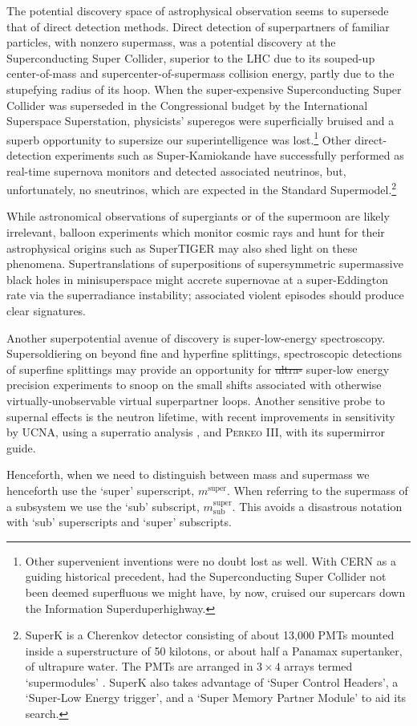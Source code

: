 The potential discovery space of astrophysical observation seems to supersede that of direct detection methods. 
Direct detection of superpartners of familiar particles, with nonzero supermass, was a potential discovery at the Superconducting Super Collider, superior to the LHC due to its souped-up center-of-mass and supercenter-of-supermass collision energy, partly due to the stupefying radius of its hoop.
When the super-expensive Superconducting Super Collider was superseded in the Congressional budget by the International Superspace Superstation, physicists' superegos were superficially bruised and a superb opportunity to supersize our superintelligence was lost.\footnote{
Other supervenient inventions were no doubt lost as well.
With CERN as a guiding historical precedent, had the Superconducting Super Collider not been deemed superfluous we might have, by now, cruised our supercars down the Information Superduperhighway.}
Other direct-detection experiments such as Super-Kamiokande have successfully performed as real-time supernova monitors and detected associated neutrinos, but, unfortunately, no sneutrinos, which are expected in the Standard Supermodel.\footnote{ 
SuperK is a Cherenkov detector consisting of about 13,000 PMTs mounted inside a superstructure of 50 kilotons, or about half a Panamax supertanker, of ultrapure water.  The PMTs are arranged in $3\times4$ arrays termed `supermodules' \cite{Fukuda:2002uc}.
SuperK also takes advantage of `Super Control Headers', a `Super-Low Energy trigger', and a `Super Memory Partner Module' to aid its search.
}

While astronomical observations of supergiants or of the supermoon are likely irrelevant, balloon experiments which monitor cosmic rays and hunt for their astrophysical origins such as SuperTIGER\cite{Binns:2014xpa} may also shed light on these phenomena.
Supertranslations of superpositions of supersymmetric supermassive black holes in minisuperspace might accrete supernovae at a super-Eddington rate via the superradiance instability; associated violent episodes should produce clear signatures.

Another superpotential avenue of discovery is super-low-energy spectroscopy.
Supersoldiering on beyond fine and hyperfine splittings, spectroscopic detections of superfine splittings may provide an opportunity for \st{ultra-} super-low energy precision experiments to snoop on the small shifts associated with otherwise virtually-unobservable virtual superpartner loops.
Another sensitive probe to supernal effects is the neutron lifetime, with recent improvements in sensitivity by UCNA, using a superratio analysis \cite{Brown:2017mhw}, and P\textsc{erkeo} III, with its supermirror guide\cite{Markisch:2018ndu}.

Henceforth, when we need to distinguish between mass and supermass we henceforth use the `super' superscript, $m^{\text{super}}$.  When referring to the supermass of a subsystem we use the `sub' subscript, $m^{\text{super}}_{\text{sub}}$.  This avoids a disastrous notation with `sub' superscripts and `super' subscripts.
